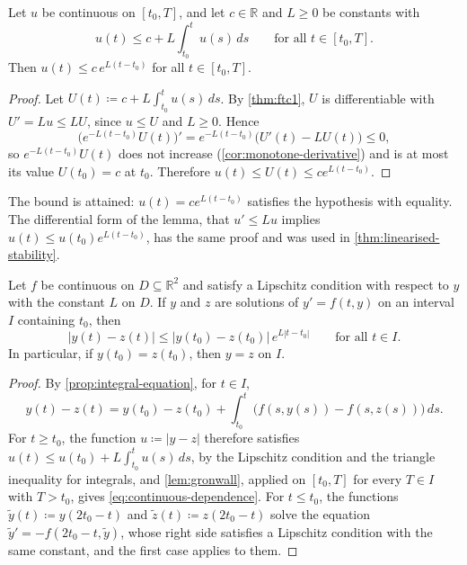 \begin{lemma}
\label{lem:gronwall}
Let $u$ be continuous on $[t_0,T]$, and let $c\in\mathbb R$ and $L\ge0$ be constants with
\[
u(t)\le c+L\int_{t_0}^tu(s)\,ds\qquad\text{for all }t\in[t_0,T].
\]
Then $u(t)\le c\,e^{L(t-t_0)}$ for all $t\in[t_0,T]$.
\end{lemma}

\begin{proof}
Let $U(t)\coloneqq c+L\int_{t_0}^tu(s)\,ds$. By \cref{thm:ftc1}, $U$ is differentiable with $U'=Lu\le LU$, since $u\le U$ and $L\ge0$. Hence
\[
\bigl(e^{-L(t-t_0)}U(t)\bigr)'=e^{-L(t-t_0)}\bigl(U'(t)-LU(t)\bigr)\le0 ,
\]
so $e^{-L(t-t_0)}U(t)$ does not increase (\cref{cor:monotone-derivative}) and is at most its value $U(t_0)=c$ at $t_0$. Therefore $u(t)\le U(t)\le ce^{L(t-t_0)}$.
\end{proof}

The bound is attained: $u(t)=ce^{L(t-t_0)}$ satisfies the hypothesis with equality. The differential form of the lemma, that $u'\le Lu$ implies $u(t)\le u(t_0)e^{L(t-t_0)}$, has the same proof and was used in \cref{thm:linearised-stability}.

\begin{theorem}
\label{thm:uniqueness}
Let $f$ be continuous on $D\subseteq\mathbb R^2$ and satisfy a Lipschitz condition with respect to $y$ with the constant $L$ on $D$. If $y$ and $z$ are solutions of $y'=f(t,y)$ on an interval $I$ containing $t_0$, then
\begin{equation}
|y(t)-z(t)|\le|y(t_0)-z(t_0)|\,e^{L|t-t_0|}\qquad\text{for all }t\in I .
\label{eq:continuous-dependence}
\end{equation}
In particular, if $y(t_0)=z(t_0)$, then $y=z$ on $I$.
\end{theorem}

\begin{proof}
By \cref{prop:integral-equation}, for $t\in I$,
\[
y(t)-z(t)=y(t_0)-z(t_0)+\int_{t_0}^t\bigl(f(s,y(s))-f(s,z(s))\bigr)\,ds .
\]
For $t\ge t_0$, the function $u\coloneqq|y-z|$ therefore satisfies $u(t)\le u(t_0)+L\int_{t_0}^tu(s)\,ds$, by the Lipschitz condition and the triangle inequality for integrals, and \cref{lem:gronwall}, applied on $[t_0,T]$ for every $T\in I$ with $T>t_0$, gives \eqref{eq:continuous-dependence}. For $t\le t_0$, the functions $\tilde y(t)\coloneqq y(2t_0-t)$ and $\tilde z(t)\coloneqq z(2t_0-t)$ solve the equation $\tilde y'=-f(2t_0-t,\tilde y)$, whose right side satisfies a Lipschitz condition with the same constant, and the first case applies to them.
\end{proof}

